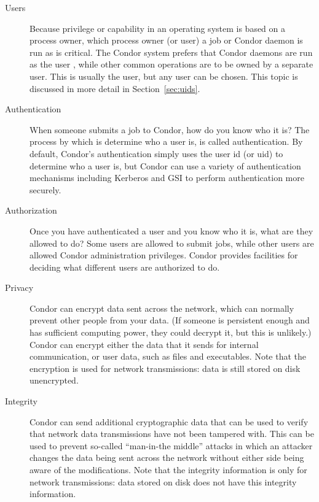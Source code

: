 \begin{description}

\item[Users] Because privilege or capability in an operating system
is based on a process owner,
which process owner (or user) a job or Condor daemon is run
as is critical.
The Condor system 
prefers that Condor daemons are run as the user ,
while other common operations are to be owned by
a separate user.
This is usually the
 user, but any user can be chosen. This topic is discussed
in more detail in Section~\ref{sec:uids}. 

\item[Authentication] When someone submits a job to Condor, how do you
know who it is? The process by which is determine who a user is, is
called authentication. By default, Condor's authentication simply uses
the user id (or uid) to determine who a user is, but Condor can use a
variety of authentication mechanisms including Kerberos and GSI to
perform authentication more securely. 

\item[Authorization] Once you have authenticated a user and you know
who it is, what are they allowed to do? Some users are allowed to
submit jobs, while other users are allowed Condor administration
privileges. Condor provides facilities for deciding what different
users are authorized to do. 

\item[Privacy] Condor can encrypt data sent across the network, which
can normally prevent other people from your data. (If someone is
persistent enough and has sufficient computing power, they could
decrypt it, but this is unlikely.) Condor can encrypt either the data
that it sends for internal communication, or user data, such as files
and executables. Note that the encryption is used for network
transmissions: data is still stored on disk unencrypted.

\item[Integrity] Condor can send additional cryptographic data that
can be used to verify that network data transmissions have not been
tampered with. This can be used to prevent so-called ``man-in-the
middle'' attacks in which an attacker changes the data being sent
across the network without either side being aware of the
modifications. Note that the integrity information is only for network
transmissions: data stored on disk does not have this integrity
information. 

\end{description}

